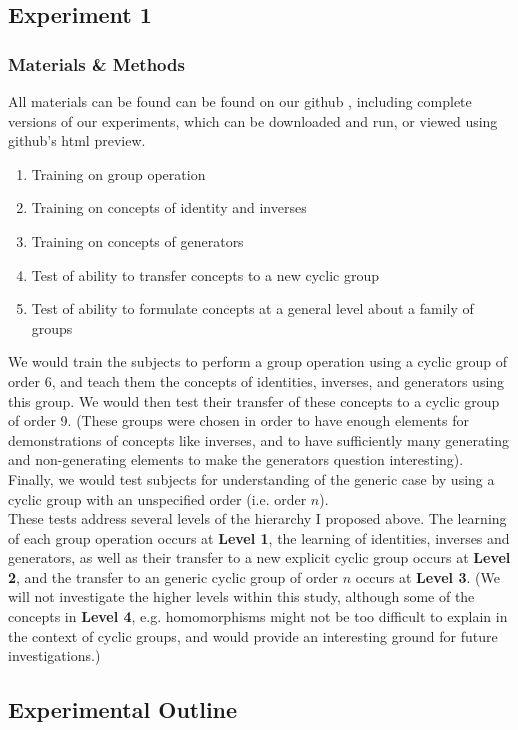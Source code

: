 \documentclass[11pt]{article}
\begin{document}
\subsection{Experiment 1}
\subsubsection{Materials & Methods} 
All materials can be found can be found on our github \cite{RepresentationsGithub}, including complete versions of our experiments, which can be downloaded and run, or viewed using github's html preview. \\[11pt]

\begin{enumerate}
\item Training on group operation
\item Training on concepts of identity and inverses
\item Training on concepts of generators
\item Test of ability to transfer concepts to a new cyclic group
\item Test of ability to formulate concepts at a general level about a family of groups
\end{enumerate}
We would train the subjects to perform a group operation using a cyclic group of order 6, and teach them the concepts of identities, inverses, and generators using this group. We would then test their transfer of these concepts to a cyclic group of order 9. (These groups were chosen in order to have enough elements for demonstrations of concepts like inverses, and to have sufficiently many generating and non-generating elements to make the generators question interesting). Finally, we would test subjects for understanding of the generic case by using a cyclic group with an unspecified order (i.e. order $n$). \\[11pt]
These tests address several levels of the hierarchy I proposed above. The learning of each group operation occurs at \textbf{Level 1}, the learning of identities, inverses and generators, as well as their transfer to a new explicit cyclic group occurs at \textbf{Level 2}, and the transfer to an generic cyclic group of order $n$ occurs at \textbf{Level 3}. (We will not investigate the higher levels within this study, although some of the concepts in \textbf{Level 4}, e.g. homomorphisms might not be too difficult to explain in the context of cyclic groups, and would provide an interesting ground for future investigations.)  
\subsection{Experimental Outline}
\end{document}
